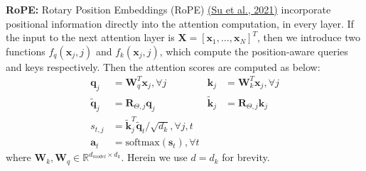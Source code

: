 \documentclass[11pt,addpoints,answers]{exam}
\newcommand{\Rb}{\mathbb{R}}
\newcommand{\av}{\mathbf{a}}
\newcommand{\kv}{\mathbf{k}}
\newcommand{\qv}{\mathbf{q}}
\newcommand{\sv}{\mathbf{s}}
\newcommand{\xv}{\mathbf{x}}
\newcommand{\Rv}{\mathbf{R}}
\newcommand{\Wv}{\mathbf{W}}
\newcommand{\Xv}{\mathbf{X}}
\begin{document}
\begin{questions}
    \textbf{RoPE:}
    Rotary Position Embeddings (RoPE) \href{https://arxiv.org/pdf/2104.09864.pdf}{(Su et al., 2021)} incorporate positional information directly into the attention computation, in every layer. If the input to the next attention layer is $\Xv = [\xv_1, \ldots, \xv_N]^T$, then we introduce two functions $f_q(\xv_j, j)$ and $f_k(\xv_j, j)$, which compute the position-aware queries and keys respectively. Then the attention scores are computed as below:
    \renewcommand{\tilde}{\widetilde}
    \begin{align*}
        \qv_j &= \Wv_q^T \xv_j, \forall j 
        & \kv_j &= \Wv_k^T \xv_j, \forall j \\
        \tilde{\qv}_j &= \Rv_{\Theta,j} \qv_j
        & \tilde{\kv}_j &= \Rv_{\Theta,j} \kv_j \\
        s_{t,j} &= \tilde{\kv}_j^T \tilde{\qv}_t / \sqrt{d_k}, \forall j,t\\
        \av_t &= \text{softmax}(\sv_t), \forall t
    \end{align*}
    where $\Wv_k, \Wv_q \in \Rb^{d_{model} \times d_k}$. 
    Herein we use $d = d_k$ for brevity. 


\end{questions}
\end{document}
